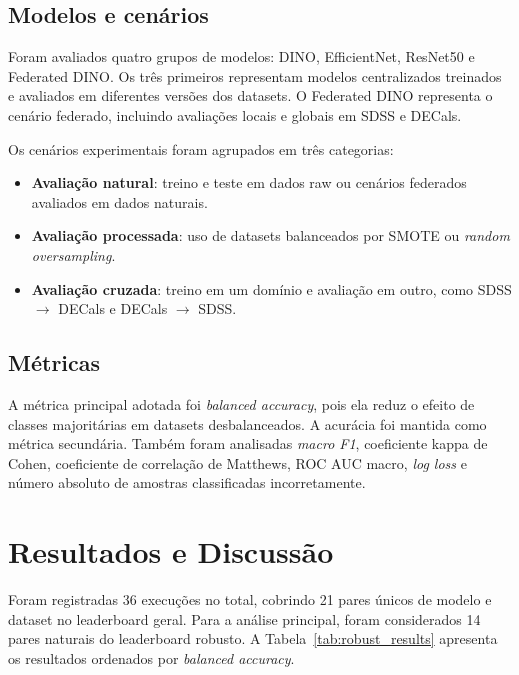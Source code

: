 \documentclass[conference]{IEEEtran}
\begin{document}
\subsection{Modelos e cenários}

Foram avaliados quatro grupos de modelos: DINO, EfficientNet, ResNet50 e Federated DINO. Os três primeiros representam modelos centralizados treinados e avaliados em diferentes versões dos datasets. O Federated DINO representa o cenário federado, incluindo avaliações locais e globais em SDSS e DECals.

Os cenários experimentais foram agrupados em três categorias:

\begin{itemize}
    \item \textbf{Avaliação natural}: treino e teste em dados raw ou cenários federados avaliados em dados naturais.
    \item \textbf{Avaliação processada}: uso de datasets balanceados por SMOTE ou \textit{random oversampling}.
    \item \textbf{Avaliação cruzada}: treino em um domínio e avaliação em outro, como SDSS $\rightarrow$ DECals e DECals $\rightarrow$ SDSS.
\end{itemize}

\subsection{Métricas}

A métrica principal adotada foi \textit{balanced accuracy}, pois ela reduz o efeito de classes majoritárias em datasets desbalanceados. A acurácia foi mantida como métrica secundária. Também foram analisadas \textit{macro F1}, coeficiente kappa de Cohen, coeficiente de correlação de Matthews, ROC AUC macro, \textit{log loss} e número absoluto de amostras classificadas incorretamente.

\section{Resultados e Discussão}
\label{sec:results}

Foram registradas 36 execuções no total, cobrindo 21 pares únicos de modelo e dataset no leaderboard geral. Para a análise principal, foram considerados 14 pares naturais do leaderboard robusto. A Tabela~\ref{tab:robust_results} apresenta os resultados ordenados por \textit{balanced accuracy}.
\end{document}
